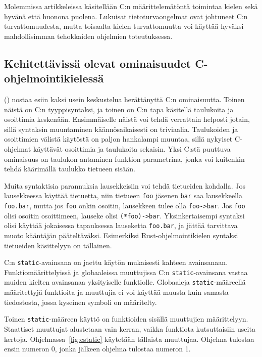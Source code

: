 Molemmissa artikkeleissa käsitellään C:n määrittelemätöntä toimintaa kielen
sekä hyvänä että huonona puolena. Lukuisat tietoturvaongelmat ovat johtuneet
C:n turvattomuudesta, mutta toisaalta kielen turvattomuutta voi käyttää hyväksi
mahdollisimman tehokkaiden ohjelmien toteutuksessa.

\subsection{Kehitettävissä olevat ominaisuudet C-ohjelmointikielessä}
\label{sec:ckehitettavat}

\citeauthor{chistory} (\citeyear{chistory}) nostaa esiin kaksi usein
keskustelua herättänyttä C:n ominaisuutta. Toinen näistä on C:n tyyppisyntaksi,
ja toinen on C:n tapa käsitellä taulukoita ja osoittimia keskenään.
Ensimmäiselle näistä voi tehdä verrattain helposti jotain, sillä syntaksin
muuntaminen käännösaikaisesti on triviaalia. Taulukoiden ja osoittimien välistä
käytöstä on paljon hankalampi muuntaa, sillä nykyiset C-ohjelmat käyttävät
osoittimia ja taulukoita sekaisin. Yksi C:stä puuttuva ominaisuus on
taulukon antaminen funktion parametrina, jonka voi kuitenkin tehdä käärimällä
taulukko tietueen sisään.

Muita syntaktisia parannuksia lausekkeisiin voi tehdä tietueiden kohdalla. Jos
lausekkeessa käyttää tietuetta, niin tietueen \texttt{foo} jäsenen \texttt{bar}
saa lausekkeella \texttt{foo.bar}, mutta jos \texttt{foo} onkin osoitin,
lausekkeen tulee olla \texttt{foo->bar}. Jos \texttt{foo} olisi osoitin
osoittimeen, lauseke olisi \texttt{(*foo)->bar}. Yksinkertaisempi syntaksi
olisi käyttää jokaisessa tapauksessa lauseketta \texttt{foo.bar}, ja jättää
tarvittava muoto kääntäjän pääteltäväksi. Esimerkiksi Rust-ohjelmointikielen
syntaksi tietueiden käsittelyyn on tällainen.

C:n \texttt{static}-avainsana on jaettu käytön mukaisesti kahteen avainsanaan.
Funktiomäärittelyissä ja globaaleissa muuttujissa C:n
\texttt{static}-avainsana vastaa muiden kielten avainsanaa yksityiselle
funktiolle. Globaaleja \texttt{static}-määreellä määritettyjä funktioita ja
muuttujia ei voi käyttää muusta kuin samasta tiedostosta, jossa kyseinen
symboli on määritelty.

Toinen \texttt{static}-määreen käyttö on funktioiden sisällä muuttujien
määrittelyyn. Staattiset muuttujat alustetaan vain kerran, vaikka funktiota
kutsuttaisiin useita kertoja. Ohjelmassa~\ref{fig:cstatic} käytetään tällaista
muuttujaa. Ohjelma tulostaa ensin numeron 0, jonka jälkeen ohjelma tulostaa
numeron 1.

